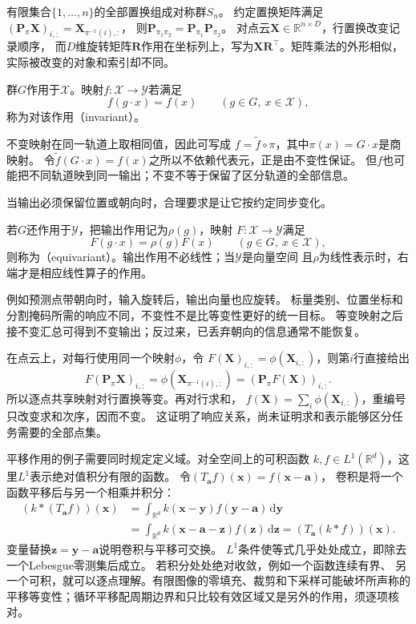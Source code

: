 有限集合$\{1,\ldots,n\}$的全部置换组成对称群$S_n$。
约定置换矩阵满足$(\bm P_\pi\bm X)_{i,:}=\bm X_{\pi^{-1}(i),:}$，
则$\bm P_{\pi_1\pi_2}=\bm P_{\pi_1}\bm P_{\pi_2}$。
对点云$\bm X\in\mathbb R^{n\times D}$，行置换改变记录顺序，
而$D$维旋转矩阵$\bm R$作用在坐标列上，写为$\bm X\bm R^\top$。矩阵乘法的外形相似，
实际被改变的对象和索引却不同。


\begin{definition}[不变映射]
\label{def:geometry-invariant-map}
群$G$作用于$\mathcal X$。映射$f:\mathcal X\to\mathcal Y$若满足
\begin{equation}
 f(g\cdot x)=f(x)\qquad(g\in G,\ x\in\mathcal X),
 \label{eq:geometry-invariant-map}
\end{equation}
称为对该作用（invariant）。
\end{definition}
不变映射在同一轨道上取相同值，因此可写成
$f=\widetilde f\circ\pi$，其中$\pi(x)=G\cdot x$是商映射。
令$\widetilde f(G\cdot x)=f(x)$之所以不依赖代表元，正是由不变性保证。
但$f$也可能把不同轨道映到同一输出；不变不等于保留了区分轨道的全部信息。


当输出必须保留位置或朝向时，合理要求是让它按约定同步变化。
\begin{definition}[等变映射]
\label{def:geometry-equivariant-map}
若$G$还作用于$\mathcal Y$，把输出作用记为$\rho(g)$，映射
$F:\mathcal X\to\mathcal Y$满足
\begin{equation}
 F(g\cdot x)=\rho(g)F(x)\qquad(g\in G,\ x\in\mathcal X),
 \label{eq:geometry-equivariant-map}
\end{equation}
则称为（equivariant）。输出作用不必线性；当$\mathcal Y$是向量空间
且$\rho$为线性表示时，右端才是相应线性算子的作用。
\end{definition}
例如预测点带朝向时，输入旋转后，输出向量也应旋转。
标量类别、位置坐标和分割掩码所需的响应不同，不变性不是比等变性更好的统一目标。
等变映射之后接不变汇总可得到不变输出；反过来，已丢弃朝向的信息通常不能恢复。

在点云上，对每行使用同一个映射$\phi$，令
$F(\bm X)_{i,:}=\phi(\bm X_{i,:})$，则第$i$行直接给出
\[
 F(\bm P_\pi\bm X)_{i,:}
 =\phi(\bm X_{\pi^{-1}(i),:})
 =(\bm P_\pi F(\bm X))_{i,:}.
\]
所以逐点共享映射对行置换等变。再对行求和，
$f(\bm X)=\sum_i\phi(\bm X_{i,:})$，重编号只改变求和次序，因而不变。
这证明了响应关系，尚未证明求和表示能够区分任务需要的全部点集。

平移作用的例子需要同时规定定义域。对全空间上的可积函数
$k,f\in L^1(\mathbb R^d)$，这里$L^1$表示绝对值积分有限的函数。
令$(T_{\bm a}f)(\bm x)=f(\bm x-\bm a)$，
卷积是将一个函数平移后与另一个相乘并积分：
\begin{align}
 (k*(T_{\bm a}f))(\bm x)
 &=\int_{\mathbb R^d}k(\bm x-\bm y)f(\bm y-\bm a)\,\mathrm d\bm y\\
 &=\int_{\mathbb R^d}k(\bm x-\bm a-\bm z)f(\bm z)\,\mathrm d\bm z
   =(T_{\bm a}(k*f))(\bm x).
 \label{eq:geometry-translation-convolution-equivariance}
\end{align}
变量替换$\bm z=\bm y-\bm a$说明卷积与平移可交换。
$L^1$条件使等式几乎处处成立，即除去一个Lebesgue零测集后成立。
若积分处处绝对收敛，例如一个函数连续有界、
另一个可积，就可以逐点理解。有限图像的零填充、裁剪和下采样可能破坏所声称的
平移等变性；循环平移配周期边界和只比较有效区域又是另外的作用，须逐项核对。

